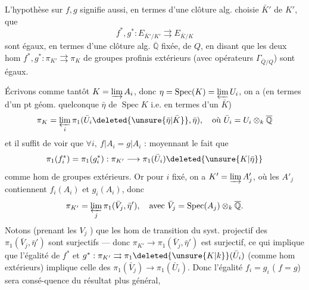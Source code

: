 L'hypothèse sur $f,g$ signifie aussi, en termes d'une clôture alg. choisie $\bar K'$  de $K'$, que 
\[
f^*,g^*:E_{\bar K'/K'}\rightrightarrows E_{\bar K/K}
\]
sont égaux, 
 en termes d'une clôture alg. $\overline{\mathbb Q}$ fixée, de $Q$, en disant que les deux hom $f^*,g^*:\pi_{K'}\rightrightarrows\pi_K$ de groupes profinis extérieurs (avec opérateurs $\Gamma_{\bar Q/Q}$) sont égaux.

Écrivons comme tantôt $K=\varinjlim A_i$, donc  $\eta=\operatorname{Spec}(K)=\varprojlim U_i$, on a (en termes d'un pt géom. quelconque $\bar\eta$ de $\operatorname{Spec}K$ i.e. en termes d'un $\bar K$)
\[
\pi_K=\varprojlim_i\pi_1(\bar U_i\deleted{\unsure{\bar\eta|\bar K}},\bar\eta),\quad\text{où }\bar U_i=U_i\otimes_k\overline{\mathbb Q}
\]
et il suffit de voir que $\forall i,\ f|A_i=g|A_i$ : moyennant le fait que
\[
\pi_1(f_i^*)=\pi_1(g_i^*):\pi_{K'}\longrightarrow\pi_1(\bar U_i)\deleted{\unsure{K|\bar\eta}}
\]
comme hom de groupes extérieurs. Or pour $i$ fixé, on a $K'=\varinjlim A'_j$, où les $A'_j$ contiennent $f_i(A_i)$ et $g_i(A_i)$, donc
\[
\pi_{K'}=\varprojlim_j\pi_1(\bar V_j,\bar\eta'),\quad\text{avec }\bar V_j=\operatorname{Spec}(A_j)\otimes_k\overline{\mathbb Q}.
\]
Notons (prenant les $V_j$ ) que les hom de transition du syst. projectif des $\pi_1(\bar V_j,\bar\eta')$ sont surjectifs --- donc $\pi_{K'}\longrightarrow\pi_1(\bar V_j,\bar\eta')$ est surjectif, ce qui implique que l'égalité de $f^*$ et $g^*:\pi_{K'}\rightrightarrows\pi_1\deleted{\unsure{K|k}}(\bar U_i)$ (comme hom extérieurs) implique celle des $\pi_1(\bar V_j)\longrightarrow\pi_1(\bar U_i)$.
Donc l'égalité $f_i=g_i$ ( $f=g$) sera consé-quence du résultat plus général,

